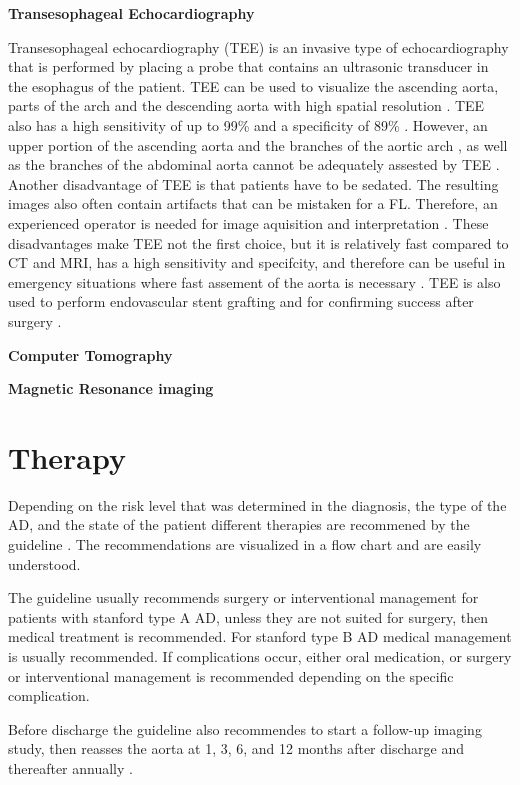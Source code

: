 \documentclass[thesis.tex]{subfiles}
\begin{document}
\textbf{Transesophageal Echocardiography}

Transesophageal echocardiography (TEE) is an invasive type of echocardiography that is performed by placing a probe that contains an ultrasonic transducer in the esophagus of the patient. TEE can be used to visualize the ascending aorta, parts of the arch and the descending aorta with high spatial resolution \cite{baliga2014role}. TEE also has a high sensitivity of up to 99\% and a specificity of 89\% \cite{baliga2014role}. However, an upper portion of the ascending aorta and the branches of the aortic arch \cite{shiga2006diagnostic,baliga2014role}, as well as the branches of the abdominal aorta cannot be adequately assested by TEE \cite{baliga2014role}. Another disadvantage of TEE is that patients have to be sedated. The resulting images also often contain artifacts that can be mistaken for a FL. Therefore, an experienced operator is needed for image aquisition and interpretation \cite{shiga2006diagnostic,baliga2014role}. These disadvantages make TEE not the first choice, but it is relatively fast compared to CT and MRI, has a high sensitivity and specifcity, and therefore can be useful in emergency situations where fast assement of the aorta is necessary \cite{shiga2006diagnostic,baliga2014role}. TEE is also used to perform endovascular stent grafting and for confirming success after surgery \cite{baliga2014role}. 

\textbf{Computer Tomography} 

\textbf{Magnetic Resonance imaging}
\section{Therapy} 

Depending on the risk level that was determined in the diagnosis, the type of the AD, and the state of the patient different therapies are recommened by the guideline \cite{hiratzka20102010}. The recommendations are visualized in a flow chart and are easily understood.

The guideline usually recommends surgery or interventional management for patients with stanford type A AD, unless they are not suited for surgery, then medical treatment is recommended. For stanford type B AD medical management is usually recommended. If complications occur, either oral medication, or surgery or interventional management is recommended depending on the specific complication. 

Before discharge the guideline also recommendes to start a follow-up imaging study, then reasses the aorta at 1, 3, 6, and 12 months after discharge and thereafter annually \cite{hiratzka20102010}.
\end{document}
